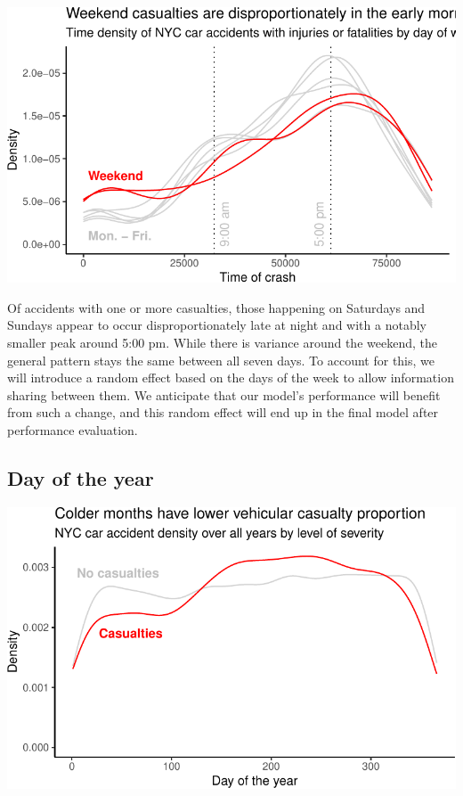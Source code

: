 \documentclass[
  letterpaper,
  DIV=11,
  numbers=noendperiod]{scrartcl}
\begin{document}
\includegraphics{project_files/figure-pdf/viz-time-density-1.pdf}

Of accidents with one or more casualties, those happening on Saturdays
and Sundays appear to occur disproportionately late at night and with a
notably smaller peak around 5:00 pm. While there is variance around the
weekend, the general pattern stays the same between all seven days. To
account for this, we will introduce a random effect based on the days of
the week to allow information sharing between them. We anticipate that
our model's performance will benefit from such a change, and this random
effect will end up in the final model after performance evaluation.

\hypertarget{day-of-the-year}{%
\subsection{Day of the year}\label{day-of-the-year}}

\includegraphics{project_files/figure-pdf/viz-density-severity-day-of-year-1.pdf}
\end{document}
